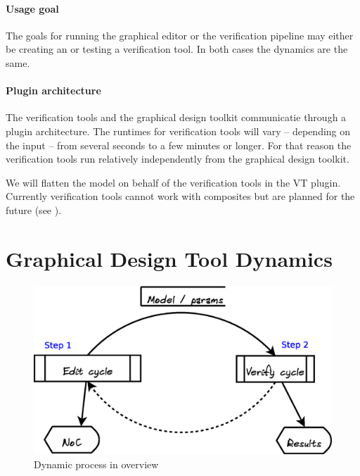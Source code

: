 \paragraph{Usage goal} The goals for running the graphical editor 
or the verification pipeline may either be creating an \Noc or 
testing a verification tool. In both cases the dynamics are the same.

\paragraph{Plugin architecture} The verification tools and the graphical 
design toolkit communicatie through a plugin architecture.
The runtimes for verification tools will vary -- depending on the input --
from several seconds to a few minutes or longer. For that reason the 
verification tools run relatively independently from the graphical 
design toolkit. 



We will flatten the model on behalf of the verification tools in the VT plugin.
Currently verification tools cannot work with composites but are planned for the future 
(see \citep[question 14 on page 32]{ou:team23-endreport}).

\section{Graphical Design Tool Dynamics}

\pagedepth\maxdimen

\begin{figure}
	\includegraphics[width=.95\linewidth]{../architecture-dynamic-overview}
	\caption{Dynamic process in overview}
	\label{fig:overview-dynamic}
\end{figure}

